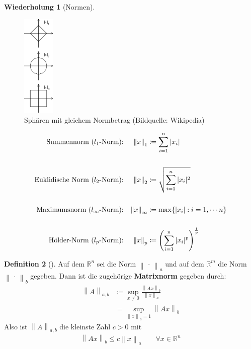\documentclass[ngerman,fontsize=11pt, paper=a4, parskip=half, titlepage=true, toc=bib]{scrbook}
\theoremstyle{definition}
\newtheorem{Def}{Definition}[section]		%
\newtheorem{Wdh}[Def]{Wiederholung}
\theoremstyle{plain}
\newcommand{\R}{\mathds{R}}
\newcommand{\nn}[1]{\left\| #1 \right\|}
\newcommand{\subsectione}[1]{\subsection{#1} \addtocounter{Def}{1}}
\newenvironment{Defe}[1][]{ %
	\begin{Def}[#1]
	}
	{
	\end{Def}
	\addtocounter{subsection}{1}
}
\newenvironment{Wdhe}[1][]{ %
	\begin{Wdh}[#1]
	}
	{
	\end{Wdh}
	\addtocounter{subsection}{1}
}
\begin{document}
  \begin{Wdhe}[Normen]
  	\label{3.2.3}
  	\begin{figure}
  		\centering
  		\includegraphics[width=1.5cm]{images/normen.png}
  		\caption{Sphären mit gleichem Normbetrag (Bildquelle: Wikipedia)}
  	\end{figure}
  	
  	\begin{align*}
  	\text{Summennorm ($l_1$-Norm):} &&	\nn{x}_1 &\coloneqq \sum_{i=1}^{n}|x_i| 
  	\index{Norm!Summennorm}\\
  	\\
  	\text{Euklidische Norm ($l_2$-Norm):} &&	\nn{x}_2 &\coloneqq \sqrt{\sum_{i=1}^{n}|x_i|^2}
  	\index{Norm!Euklidische Norm} \\
  	\\
  	\text{Maximumsnorm ($l_\infty$-Norm):} &&\nn{x}_\infty &\coloneqq \max\{|x_i| : i=1, \cdots n\} \\
  	\index{Norm!Maximumsnorm}
  	\\
  	\text{Hölder-Norm ($l_p$-Norm):} &&	\nn{x}_p &\coloneqq 
  	\left(\sum_{i=1}^{n}|x_i|^p\right)^{\frac{1}{p}} 
  	\index{Norm!Hölder-Norm}
  	\end{align*}
  \end{Wdhe}



  \begin{Defe}
  	\label{3.2.4}
  	Auf dem $\R^n$  sei die Norm $\nn{\,\cdot\,}_a$ und auf dem $\R^m$ die Norm $\nn{\,\cdot\,}_b$ gegeben.
  	Dann ist die zugehörige \textbf{Matrixnorm}  gegeben durch:
  	\begin{align}
  	\nn{A}_{a,b} &\coloneqq \sup_{x\neq 0} \frac{\nn{Ax}_b}{\nn{x}_a} \\ \nonumber
  	&= \sup_{\nn{x}_a=1} \nn{Ax}_b \label{III.2.1} 
  	\end{align}
  	Also ist   $\nn{A}_{a,b}$ die kleinste Zahl $c>0$ mit
  	\begin{gather*}
  	\nn{Ax}_b  \leq c\nn{x}_a \quad\quad \forall x\in \R^n
  	\end{gather*}
  \end{Defe}
\end{document}
